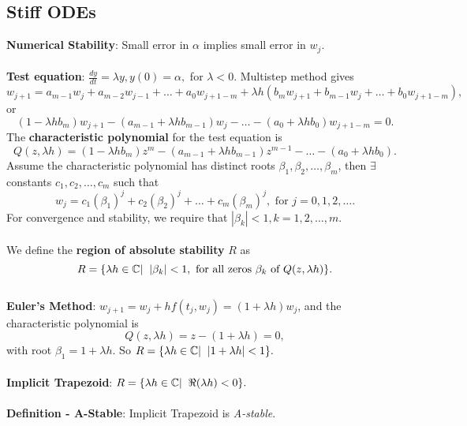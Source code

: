 \documentclass{article}
\begin{document}
\subsection*{Stiff ODEs}
\textbf{Numerical Stability}: Small error in $\alpha$ implies small error in $w_j$. \\ \\
\textbf{Test equation}: $\frac{dy}{dt} = \lambda y, y(0) = \alpha,$ for $\lambda < 0.$ Multistep method gives $$w_{j + 1} = a_{m - 1} w_j + a_{m - 2} w_{j - 1} + \dots + a_0 w_{j + 1 - m} + \lambda h(b_m w_{j + 1} + b_{m - 1} w_j + \dots + b_0 w_{j + 1 - m}),$$ or $$(1 - \lambda h b_m)w_{j + 1} - (a_{m - 1} + \lambda h b_{m - 1})w_j - \dots - (a_0 + \lambda h b_0)w_{j + 1 - m} = 0.$$ The \textbf{characteristic polynomial} for the test equation is $$Q(z, \lambda h) = (1 - \lambda h b_m)z^m - (a_{m - 1} + \lambda h b_{m - 1})z^{m - 1} - \dots - (a_0 + \lambda h b_0).$$ Assume the characteristic polynomial has distinct roots $\beta_1, \beta_2, \dots, \beta_m$, then $\exists$ constants $c_1, c_2, \dots, c_m$ such that $$w_j = c_1 (\beta_1)^j + c_2 (\beta_2)^j + \dots + c_m (\beta_m)^j, \text{ for } j = 0, 1, 2, \dots.$$ For convergence and stability, we require that $|\beta_k| < 1, k = 1, 2, \dots, m$. \\ \\
We define the \textbf{region of absolute stability} $R$ as $$R = \{ \lambda h \in \mathbb{C} | \hspace{0.2cm} |\beta_k| < 1, \text{ for all zeros } \beta_k \text{ of } Q(z, \lambda h)\}.$$ \\
\textbf{Euler's Method}: $w_{j + 1} = w_j + hf(t_j, w_j) = (1 + \lambda h)w_j$, and the characteristic polynomial is $$Q(z, \lambda h) = z - (1 + \lambda h) = 0,$$ with root $\beta_1 = 1 + \lambda h$. So $R = \{\lambda h \in \mathbb{C} | \hspace{0.2cm} |1 + \lambda h| < 1\}.$ \\ \\
\textbf{Implicit Trapezoid}: $R = \{\lambda h \in \mathbb{C} | \hspace{0.2cm} \Re(\lambda h) < 0\}.$ \\ \\
\textbf{Definition - A-Stable}: Implicit Trapezoid is \textit{A-stable}.
\end{document}
